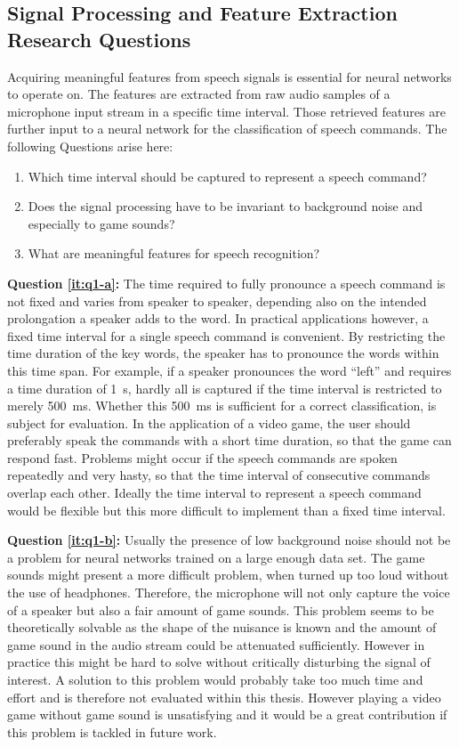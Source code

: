 \subsection{Signal Processing and Feature Extraction Research Questions}\label{sec:intro_rq_signal}
Acquiring meaningful features from speech signals is essential for neural networks to operate on. 
The features are extracted from raw audio samples of a microphone input stream in a specific time interval.
Those retrieved features are further input to a neural network for the classification of speech commands.
The following Questions arise here:
\begin{enumerate}[label={Q.1.\alph*)}, leftmargin=1.75cm]
  \item Which time interval should be captured to represent a speech command?\label{it:q1-a}
  \item Does the signal processing have to be invariant to background noise and especially to game sounds?\label{it:q1-b}
  \item What are meaningful features for speech recognition?\label{it:q1-c}
\end{enumerate}
\noindent
\textbf{Question \ref{it:q1-a}:} 
The time required to fully pronounce a speech command is not fixed and varies from speaker to speaker, depending also on the intended prolongation a speaker adds to the word.
In practical applications however, a fixed time interval for a single speech command is convenient.
By restricting the time duration of the key words, the speaker has to pronounce the words within this time span.
For example, if a speaker pronounces the word \enquote{left} and requires a time duration of \SI{1}{\second}, hardly all is captured if the time interval is restricted to merely \SI{500}{\milli\second}.
Whether this \SI{500}{\milli\second} is sufficient for a correct classification, is subject for evaluation.
In the application of a video game, the user should preferably speak the commands with a short time duration, so that the game can respond fast.
Problems might occur if the speech commands are spoken repeatedly and very hasty, so that the time interval of consecutive commands overlap each other.
Ideally the time interval to represent a speech command would be flexible but this more difficult to implement than a fixed time interval.

\textbf{Question \ref{it:q1-b}:}
Usually the presence of low background noise should not be a problem for neural networks trained on a large enough data set. 
The game sounds might present a more difficult problem, when turned up too loud without the use of headphones. 
Therefore, the microphone will not only capture the voice of a speaker but also a fair amount of game sounds. 
This problem seems to be theoretically solvable as the shape of the nuisance is known and the amount of game sound in the audio stream could be attenuated sufficiently.
However in practice this might be hard to solve without critically disturbing the signal of interest.
A solution to this problem would probably take too much time and effort and is therefore not evaluated within this thesis. 
However playing a video game without game sound is unsatisfying and it would be a great contribution if this problem is tackled in future work.

